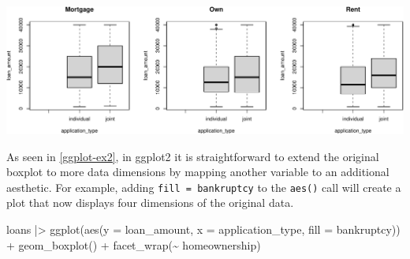 \documentclass[12pt]{article}
\newenvironment{Shaded}{\begin{snugshade}}{\end{snugshade}}
\newcommand{\AttributeTok}[1]{\textcolor[rgb]{0.77,0.63,0.00}{#1}}
\newcommand{\ControlFlowTok}[1]{\textcolor[rgb]{0.13,0.29,0.53}{\textbf{#1}}}
\newcommand{\DecValTok}[1]{\textcolor[rgb]{0.00,0.00,0.81}{#1}}
\newcommand{\FunctionTok}[1]{\textcolor[rgb]{0.00,0.00,0.00}{#1}}
\newcommand{\NormalTok}[1]{#1}
\newcommand{\OtherTok}[1]{\textcolor[rgb]{0.56,0.35,0.01}{#1}}
\newcommand{\SpecialCharTok}[1]{\textcolor[rgb]{0.00,0.00,0.00}{#1}}
\begin{document}
\linespread{1}

\begin{Shaded}
\end{Shaded}

\begin{center}\includegraphics[width=1\linewidth]{educators-perspective-tidyverse_files/figure-latex/base_plot_ex-1} \end{center}

\label{base-plot-ex} \linespread{2}
\vspace{3mm}\setlength{\parindent}{15pt}

As seen in \ref{ggplot-ex2}, in ggplot2 it is straightforward to extend
the original boxplot to more data dimensions by mapping another variable
to an additional aesthetic. For example, adding
\texttt{fill\ =\ bankruptcy} to the \texttt{aes()} call will create a
plot that now displays four dimensions of the original data.

\linespread{1}

\begin{Shaded}
\begin{Highlighting}[]
\NormalTok{loans }\SpecialCharTok{|\textgreater{}}
  \FunctionTok{ggplot}\NormalTok{(}\FunctionTok{aes}\NormalTok{(}\AttributeTok{y =}\NormalTok{ loan\_amount, }\AttributeTok{x =}\NormalTok{ application\_type, }\AttributeTok{fill =}\NormalTok{ bankruptcy)) }\SpecialCharTok{+}
  \FunctionTok{geom\_boxplot}\NormalTok{() }\SpecialCharTok{+}
  \FunctionTok{facet\_wrap}\NormalTok{(}\SpecialCharTok{\textasciitilde{}}\NormalTok{ homeownership)}
\end{Highlighting}
\end{Shaded}
\end{document}
